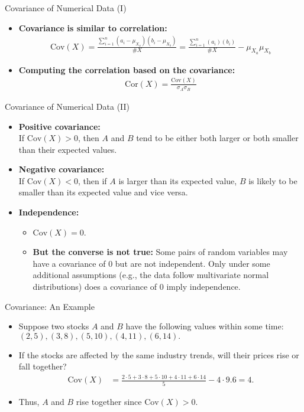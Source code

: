 \begin{frame}{Covariance of Numerical Data (I)}
	\begin{itemize}
		\item \textbf{\color{airforceblue}Covariance} \textbf{is similar to 
		correlation:}\\
		\begin{align}
			\text{Cov}(X) = 
			\frac{\sum_{i=1}^{n}(a_i-\mu_{X_a})(b_i-\mu_{X_b})}{\#X} = 
			\frac{\sum_{i=1}^{n}(a_i)(b_i)}{\#X}-\mu_{X_a}\mu_{X_b}
		\end{align}
		\item \textbf{Computing the correlation based on the covariance:}\\
		\begin{align}
			\text{Cor}({X}) = \frac{\text{Cov}(X)}{\sigma_A\sigma_B}
		\end{align}
	\end{itemize}
\end{frame}

\begin{frame}{Covariance of Numerical Data (II)}
	\begin{itemize}
		\item \textbf{Positive covariance:}\\
		If $\text{Cov}(X) > 0$, then $A$ and $B$ tend to be either both 
		larger or both smaller than their expected values.
		\item \textbf{Negative covariance:}\\
		If $\text{Cov}(X) < 0$, then if $A$ is larger than its expected 
		value, $B$ is likely to be smaller than its expected value and vice 
		versa.
		\item \textbf{Independence:}
		\begin{itemize}
			\item $\text{Cov}(X) = 0$.
			\item \textbf{\color{airforceblue}But the converse is not true:} 
			Some pairs of random variables may have a covariance of $0$ but are 
			not independent. Only under some additional assumptions (e.g., the 
			data follow multivariate normal distributions) does a covariance of 
			$0$ imply independence.
		\end{itemize}
	\end{itemize}
\end{frame}

\begin{frame}{Covariance: An Example}
	\begin{itemize}
		\item Suppose two stocks $A$ and $B$ have the following values within 
		some time:\\
		$(2,5), (3,8), (5,10), (4,11), (6,14).$
		\item If the stocks are affected by the same industry trends, will 
		their prices rise or fall together?
		\begin{align}
			\text{Cov}(X) & = \frac{2\cdot5 + 3\cdot 8 + 5 \cdot 10 + 4 \cdot 
			11 + 6 \cdot 14}{5} - 4\cdot 9.6 = 4. 
		\end{align}
		\item Thus, $A$ and $B$ rise together since $\text{Cov}(X) > 0$.
	\end{itemize}
\end{frame}